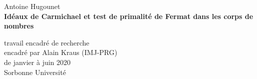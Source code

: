 \begin{center}
	\large Antoine Hugounet \\

	\vspace{25px}
	\LARGE \textbf{Idéaux de Carmichael et test de primalité de Fermat dans les corps de nombres}

	\vspace{25px}
	\large
	travail encadré de recherche \\
	encadré par Alain Kraus (IMJ-PRG) \\
	de janvier à juin 2020 \\

	\vspace{20px}
	Sorbonne Université

	\vspace{0.7cm}
	\begin{center}
	\end{center}

	\normalsize
	\renewcommand{\contentsname}{}
	\vspace{10px}
	\tableofcontents
\end{center}
